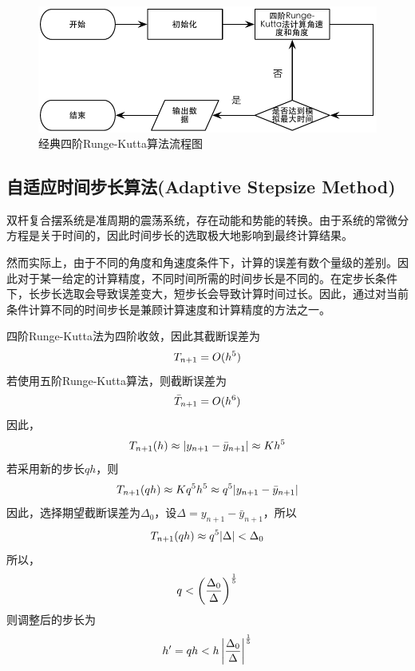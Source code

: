\documentclass[a4paper,12pt,titlepage]{article}
\begin{document}
\begin{figure}[H]
\centering
\includegraphics[height=0.13\textheight]{./process_RK.pdf}
\caption[Caption for LOF]{经典四阶Runge-Kutta算法流程图}
\label{fig:process_RK}
\end{figure}


\subsection{自适应时间步长算法(Adaptive Stepsize Method)}
双杆复合摆系统是准周期的震荡系统，存在动能和势能的转换。由于系统的常微分方程是关于时间的，因此时间步长的选取极大地影响到最终计算结果。

然而实际上，由于不同的角度和角速度条件下，计算的误差有数个量级的差别。因此对于某一给定的计算精度，不同时间所需的时间步长是不同的。在定步长条件下，长步长选取会导致误差变大，短步长会导致计算时间过长。因此，通过对当前条件计算不同的时间步长是兼顾计算速度和计算精度的方法之一。

四阶Runge-Kutta法为四阶收敛，因此其截断误差为
\begin{equation}
	T_{n+1}=O(h^{5}) \notag
\end{equation}
若使用五阶Runge-Kutta算法，则截断误差为
\begin{equation}
	\bar{T}_{n+1}=O(h^{6}) \notag
\end{equation}
因此，
\begin{equation}
	T_{n+1}(h)\approx|y_{n+1}-\bar{y}_{n+1}|\approx Kh^5 \notag
\end{equation}
若采用新的步长$qh$，则
\begin{equation}
	T_{n+1}(qh)\approx Kq^5h^5 \approx q^5|y_{n+1}-\bar{y}_{n+1}| \notag
\end{equation}
因此，选择期望截断误差为$\Delta_0$，设$\Delta=y_{n+1}-\bar{y}_{n+1}$，所以
\begin{equation}
	T_{n+1}(qh)\approx q^5|\Delta| < \Delta_0 \notag
\end{equation}
所以，
\begin{equation}
	q<\left( \frac{\Delta_0}{\Delta} \right)^{\frac{1}{5}} \notag
\end{equation}
则调整后的步长为
\begin{equation}
	h'=qh<h\left|\frac{\Delta_0}{\Delta}\right|^{\frac{1}{5}} \notag
\end{equation}
\end{document}
